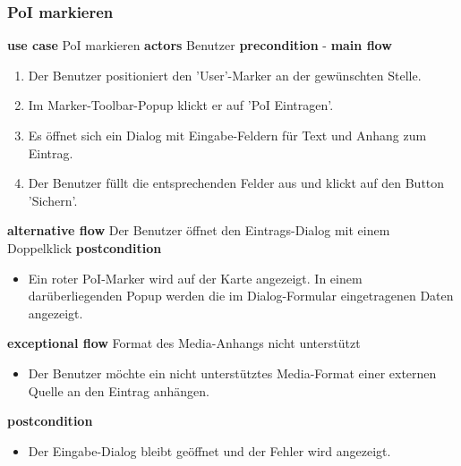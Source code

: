 \subsubsection{PoI markieren}\label{subsubsec:uc_poinew}
\noindent \textbf{use case} PoI markieren \newline
\indent \textbf{actors} \newline
\indent \indent Benutzer \newline
\indent \textbf{precondition} \newline
\indent \indent - \newline
\indent \textbf{main flow}
\begin{enumerate}[labelwidth=0pt,leftmargin=39pt,noitemsep,topsep=0pt,parsep=0pt,partopsep=0pt]
\item Der Benutzer positioniert den 'User'-Marker an der gewünschten Stelle.
\item Im Marker-Toolbar-Popup klickt er auf 'PoI Eintragen'.
\item Es öffnet sich ein Dialog mit Eingabe-Feldern für Text und Anhang zum Eintrag.
\item Der Benutzer füllt die entsprechenden Felder aus und klickt auf den Button 'Sichern'.
\end{enumerate}
\indent \indent \textbf{alternative flow} \newline
\indent \indent Der Benutzer öffnet den Eintrags-Dialog mit einem Doppelklick \newline
\indent \textbf{postcondition}
\begin{itemize}[label={},labelwidth=0pt,leftmargin=24pt,noitemsep,topsep=0pt,parsep=0pt,partopsep=0pt]
\item Ein roter PoI-Marker wird auf der Karte angezeigt. In einem darüberliegenden Popup werden die im Dialog-Formular eingetragenen Daten angezeigt.  
\end{itemize}
\indent \indent \textbf{exceptional flow} Format des Media-Anhangs nicht unterstützt
\begin{itemize}[label={},labelwidth=0pt,leftmargin=24pt,noitemsep,topsep=0pt,parsep=0pt,partopsep=0pt]
\item Der Benutzer möchte ein nicht unterstütztes Media-Format einer externen Quelle an den Eintrag anhängen.
\end{itemize}
\indent \indent \textbf{postcondition}
\begin{itemize}[label={},labelwidth=0pt,leftmargin=24pt,noitemsep,topsep=0pt,parsep=0pt,partopsep=0pt]
\item Der Eingabe-Dialog bleibt geöffnet und der Fehler wird angezeigt.
\end{itemize}
